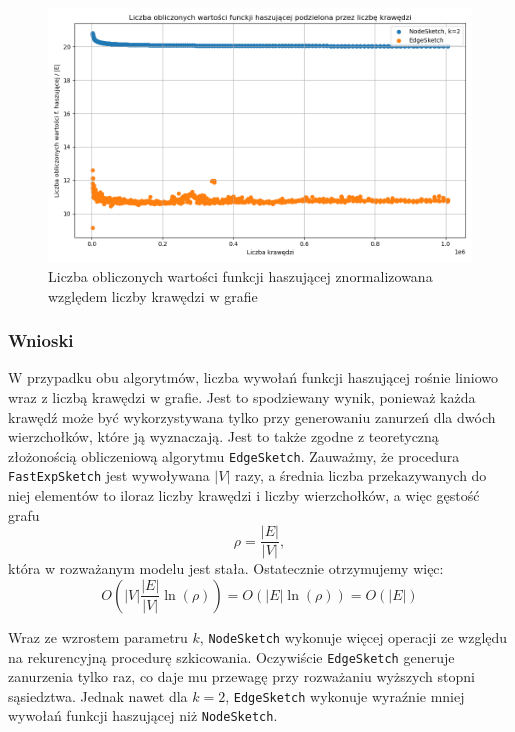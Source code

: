 \begin{figure}[!ht]
    \includegraphics[width=14cm]{img/calculated_hashes_vs_edges_relative.png}
    \centering
    \caption[Liczba operacji znormalizowana]{Liczba obliczonych wartości funkcji haszującej znormalizowana względem liczby krawędzi w grafie}
    \label{fig:calculated_hashes_vs_edges_relative}
\end{figure}

\subsubsection*{Wnioski}
W przypadku obu algorytmów, liczba wywołań funkcji haszującej rośnie liniowo wraz z liczbą krawędzi w grafie. Jest to spodziewany wynik, ponieważ każda krawędź może być wykorzystywana tylko przy generowaniu zanurzeń dla dwóch wierzchołków, które ją wyznaczają. Jest to także zgodne z teoretyczną złożonością obliczeniową algorytmu \texttt{EdgeSketch}. Zauważmy, że procedura \texttt{FastExpSketch} jest wywoływana $|V|$ razy, a średnia liczba przekazywanych do niej elementów to iloraz liczby krawędzi i liczby wierzchołków, a więc gęstość grafu 
\[
    \rho = \frac{|E|}{|V|},
\]
która w rozważanym modelu jest stała. Ostatecznie otrzymujemy więc:
\[
    O(|V| \frac{|E|}{|V|} \ln(\rho)) = O(|E| \ln(\rho)) = O(|E|)
\]

Wraz ze wzrostem parametru $k$, \texttt{NodeSketch} wykonuje więcej operacji ze względu na rekurencyjną procedurę szkicowania. Oczywiście \texttt{EdgeSketch} generuje zanurzenia tylko raz, co daje mu przewagę przy rozważaniu wyższych stopni sąsiedztwa. Jednak nawet dla $k = 2$, \texttt{EdgeSketch} wykonuje wyraźnie mniej wywołań funkcji haszującej niż \texttt{NodeSketch}.

